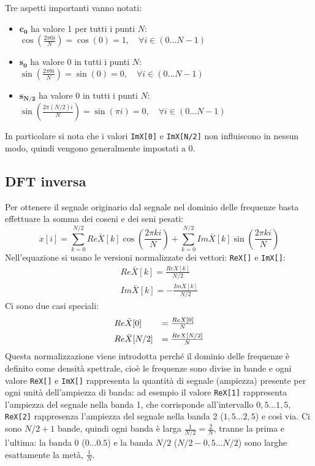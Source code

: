 Tre aspetti importanti vanno notati:
\begin{itemize}
	\item $\boldsymbol{c_0}$ ha valore 1 per tutti i punti $N$:
		$\cos\left(\frac{2\pi 0i}{N}\right) = \cos(0) = 1, \quad \forall i \in
		(0 \dots N-1)$
	\item $\boldsymbol{s_0}$ ha valore 0 in tutti i punti $N$:
		$\sin\left(\frac{2\pi 0i}{N}\right) = \sin(0) = 0, \quad \forall i \in
		(0 \dots N-1)$
	\item $\boldsymbol{s_{N/2}}$ ha valore 0 in tutti i punti $N$:
		$\sin\left(\frac{2\pi (N/2)i}{N}\right) = \sin(\pi i) = 0, \quad \forall i \in
		(0 \dots N-1)$
\end{itemize}

In particolare si nota che i valori \texttt{ImX[0]} e \texttt{ImX[N/2]} non
influiscono in nessun modo, quindi vengono generalmente impostati a 0. 

\subsection{DFT inversa}
Per ottenere il segnale originario dal segnale nel dominio delle frequenze basta
effettuare la somma dei coseni e dei seni pesati:
\[
x[i] = \sum_{k=0}^{N/2} Re\bar{X}[k] \cos\left(\frac{2\pi ki}{N}\right) +
\sum_{k=0}^{N/2} Im\bar{X}[k] \sin\left(\frac{2\pi ki}{N}\right)
\]
Nell'equazione si usano le versioni normalizzate dei vettori:
\texttt{ReX[]} e \texttt{ImX[]}:
\[
\begin{array}{l}
	Re\bar{X}[k] = \frac{ReX[k]}{N/2}\\[0.5em]
	Im\bar{X}[k] = -\frac{ImX[k]}{N/2}
\end{array}
\]
Ci sono due casi speciali:
\[
\begin{array}{l l}
	Re\bar{X}[0] & = \frac{ReX[0]}{N} \\[0.5em]
	Re\bar{X}[N/2] & = \frac{ReX[N/2]}{N}
\end{array}
\]
Questa normalizzazione viene introdotta perch\'e il dominio delle frequenze \`e
definito come densit\`a spettrale, cio\`e le frequenze sono divise in bande e
ogni valore \texttt{ReX[]} e \texttt{ImX[]} rappresenta la quantit\`a di segnale
(ampiezza) presente per ogni unit\`a dell'ampiezza di banda: ad esempio il
valore \texttt{ReX[1]} rappresenta l'ampiezza del segnale nella banda 1, che
corrisponde all'intervallo $0,5\dots1,5$, \texttt{ReX[2]} rappresenza l'ampiezza
del segnale nella banda 2 ($1,5\dots2,5$) e cos\`i via. Ci sono $N/2+1$ bande,
quindi ogni banda \`e larga $\frac{1}{N/2} = \frac{2}{N}$, tranne la prima e
l'ultima: la banda 0 ($0\dots 0.5$) e la banda $N/2$ ($N/2-0,5\dots N/2$) sono
larghe esattamente la met\`a, $\frac{1}{N}$.

